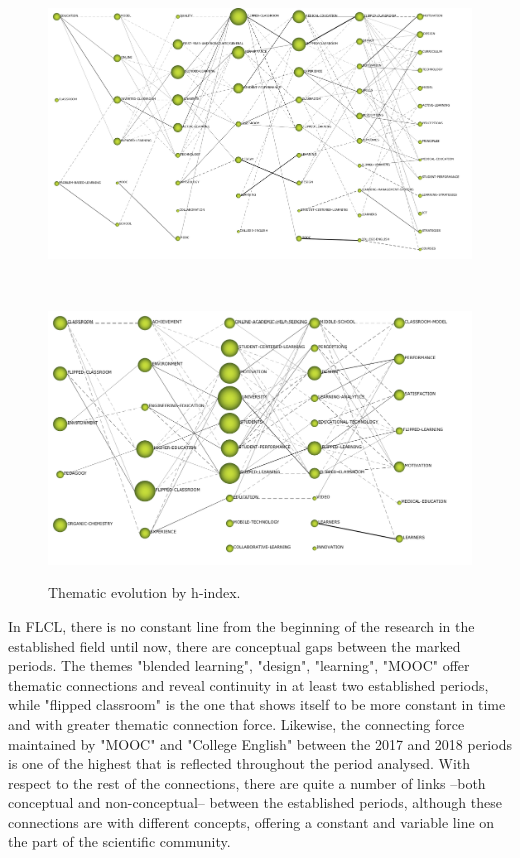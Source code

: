 \documentclass{textolivre}
\begin{document}
\begin{figure}[htbp]
 \begin{minipage}{\textwidth}
 \includegraphics[width=\textwidth]{Fig05a.png}
 \label{fig05a}
 \end{minipage}
 \\
 \begin{minipage}{\textwidth}
 \includegraphics[width=\textwidth]{Fig05b.png}
 \label{fig05b}
 \end{minipage}
 \caption{Thematic evolution by h-index.}
 \label{fig05}
\end{figure}

In FLCL, there is no constant line from the beginning of the research in the established field until now, there are conceptual gaps between the marked periods. The themes "blended learning", "design", "learning", "MOOC" offer thematic connections and reveal continuity in at least two established periods, while "flipped classroom" is the one that shows itself to be more constant in time and with greater thematic connection force. Likewise, the connecting force maintained by "MOOC" and "College English" between the 2017 and 2018 periods is one of the highest that is reflected throughout the period analysed. With respect to the rest of the connections, there are quite a number of links –both conceptual and non-conceptual– between the established periods, although these connections are with different concepts, offering a constant and variable line on the part of the scientific community.
\end{document}
